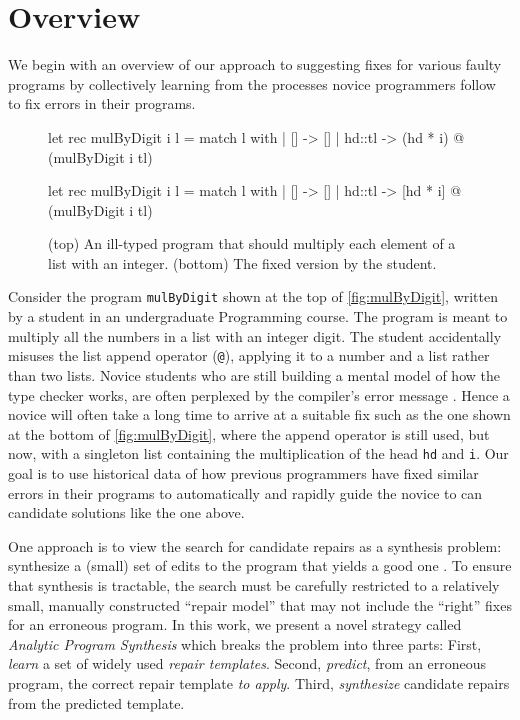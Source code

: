 \section{Overview}
\label{sec:overview}

We begin with an overview of our approach to suggesting fixes for various faulty
programs by collectively learning from the processes novice programmers follow
to fix errors in their programs.

\begin{figure}[ht]
\begin{ecode}
let rec mulByDigit i l =
  match l with
  | []     -> []
  | hd::tl -> (hd * i) @ (mulByDigit i tl)
\end{ecode}

\begin{ecode}
let rec mulByDigit i l =
  match l with
  | []     -> []
  | hd::tl -> [hd * i] @ (mulByDigit i tl)
\end{ecode}
\caption{(top) An ill-typed \ocaml program that should multiply each element
of a list with an integer. (bottom) The fixed version by the student.}
\label{fig:mulByDigit}
\end{figure}


 Consider the program \texttt{mulByDigit} shown at 
the top of \autoref{fig:mulByDigit}, written by a student in an undergraduate 
Programming course. The program is meant to multiply all the numbers in a list
with an integer digit. The student accidentally misuses the list append
operator (\texttt{@}), applying it to a number and a list rather than two lists.
%
Novice students who are still building a mental model of how the type checker
works, are often perplexed by the compiler's error message \cite{fixme}. 
Hence a novice will often take a long time to arrive at a suitable fix 
such as the one shown at the bottom of \autoref{fig:mulByDigit}, where 
the append operator is still used, but now, with a singleton list 
containing the multiplication of the head \texttt{hd} and \texttt{i}.
%
Our goal is to use historical data of how previous programmers have fixed
similar errors in their programs to automatically and rapidly guide the novice
to can candidate solutions like the one above.

%
One approach is to view the search for candidate repairs as a 
synthesis problem: synthesize a (small) set of edits to the 
program that yields a good one \cite{rishabh2013,fixme}.
%
To ensure that synthesis is tractable, the search must be 
carefully restricted to a relatively small, manually constructed 
``repair model'' that may not include the ``right'' fixes for an
erroneous program.
%
In this work, we present a novel strategy called 
\emph{Analytic Program Synthesis} which breaks the 
problem into three parts: 
%
First, \emph{learn} a set of widely used \emph{repair templates}.
%
Second, \emph{predict}, from an erroneous program, the correct repair template \emph{to apply}.
%
Third, \emph{synthesize} candidate repairs from the predicted template.


